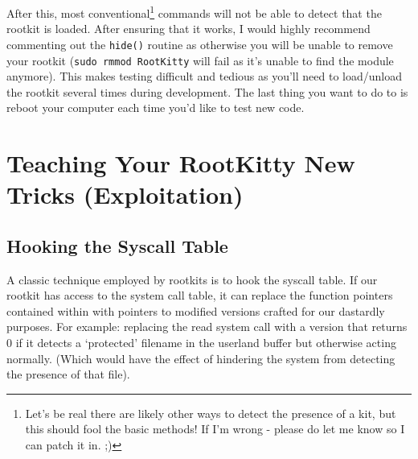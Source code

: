 \documentclass[11pt]{article}
\begin{document}
After this, most conventional\footnote[1]{Let's be real there are likely other ways to detect the presence of a kit, but this should fool the basic methods! If I'm wrong - please do let me know so I can patch it in. ;)} commands will not be able to detect that the rootkit is loaded. After ensuring that it works, I would highly recommend commenting out the \texttt{hide()} routine as otherwise you will be unable to remove your rootkit (\texttt{sudo rmmod RootKitty} will fail as it's unable to find the module anymore). This makes testing difficult and tedious as you'll need to load/unload the rootkit several times during development. The last thing you want to do to is reboot your computer each time you'd like to test new code.

\section{Teaching Your RootKitty New Tricks (Exploitation)}

\subsection{Hooking the Syscall Table}
A classic technique employed by rootkits is to hook the syscall table. If our rootkit has access to the system call table, it can replace the function pointers contained within with pointers to modified versions crafted for our dastardly purposes. For example: replacing the read system call with a version that returns 0 if it detects a `protected' filename in the userland buffer but otherwise acting normally. (Which would have the effect of hindering the system from detecting the presence of that file).\\
\end{document}
